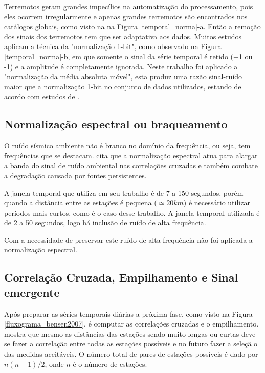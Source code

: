 Terremotos geram grandes impecílios na automatização do processamento, pois eles ocorrem irregularmente e apenas grandes terremotos são encontrados nos catálogos globais, como visto na na Figura \ref{temporal_norma}-a. Então a remoção dos sinais dos terremotos tem que ser adaptativa aos dados. Muitos estudos aplicam a técnica da "normalização 1-bit", como observado na Figura \ref{temporal_norma}-b, em que somente o sinal da série temporal é retido (+1 ou -1) e a amplitude é completamente ignorada. Neste trabalho foi aplicado a "normalização da média absoluta móvel", esta produz uma razão sinal-ruído maior que a normalização 1-bit no conjunto de dados utilizados, estando de acordo com estudos de \cite{seats_improved_2012}.

\subsection{Normalização espectral ou braqueamento}

O ruído sísmico ambiente não é branco no domínio da frequência, ou seja, tem frequências que se destacam. \cite{bensen_processing_2007} cita que a normalização espectral atua para alargar a banda do sinal de ruído ambiental nas correlações cruzadas e também combate a degradação causada por fontes persistentes.

A janela temporal que \cite{bensen_processing_2007} utiliza em seu trabalho é de 7 a 150 segundos, porém quando a distância entre as estações é pequena ($\simeq 20 km$) é necessário utilizar períodos mais curtos, como é o caso desse trabalho. A janela temporal utilizada é de 2 a 50 segundos, logo há inclusão de ruído de alta frequência.

Com a necessidade de preservar este ruído de alta frequência não foi aplicada a normalização espectral.


\subsection{Correlação Cruzada, Empilhamento e  Sinal emergente}

Após preparar as séries temporais diárias a próxima fase, como visto na Figura \ref{fluxograma_bensen2007}, é computar as correlações cruzadas e o empilhamento. \cite{bensen_processing_2007} mostra que mesmo as distâncias das estações sendo muito longas ou curtas deve-se fazer a correlação entre todas as estações possíveis e no futuro fazer a seleçã o das medidas aceitáveis. O número total de pares de estações possíveis é dado por $n(n-1)/2$, onde $n$ é o número de estações.

